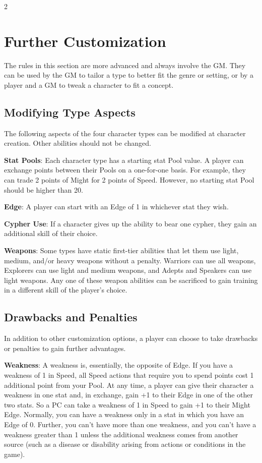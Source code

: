 \begin{multicols}{2}

\chapter{Further Customization}
The rules in this section are more advanced and always involve the GM. They can be used by the GM to tailor a type to better fit the genre or setting, or by a player and a GM to tweak a character to fit a concept.

\section{Modifying Type Aspects}

The following aspects of the four character types can be modified at character creation. Other abilities should not be changed.

\textbf{Stat Pools}: Each character type has a starting stat Pool value. A player can exchange points between their Pools on a one-for-one basis. For example, they can trade 2 points of Might for 2 points of Speed. However, no starting stat Pool should be higher than 20.

\textbf{Edge}: A player can start with an Edge of 1 in whichever stat they wish.

\textbf{Cypher Use}: If a character gives up the ability to bear one cypher, they gain an additional skill of their choice.

\textbf{Weapons}: Some types have static first-tier abilities that let them use light, medium, and/or heavy weapons without a penalty. Warriors can use all weapons, Explorers can use light and medium weapons, and Adepts and Speakers can use light weapons. Any one of these weapon abilities can be sacrificed to gain training in a different skill of the player’s choice.

\section{Drawbacks and Penalties}

In addition to other customization options, a player can choose to take drawbacks or penalties to gain further advantages.

\textbf{Weakness}: A weakness is, essentially, the opposite of Edge. If you have a weakness of 1 in Speed, all Speed actions that require you to spend points cost 1 additional point from your Pool. At any time, a player can give their character a weakness in one stat and, in exchange, gain +1 to their Edge in one of the other two stats. So a PC can take a weakness of 1 in Speed to gain +1 to their Might Edge.
Normally, you can have a weakness only in a stat in which you have an Edge of 0. Further, you can’t have more than one weakness, and you can’t have a weakness greater than 1 unless the additional weakness comes from another source (such as a disease or disability arising from actions or conditions in the game).


\end{multicols}
